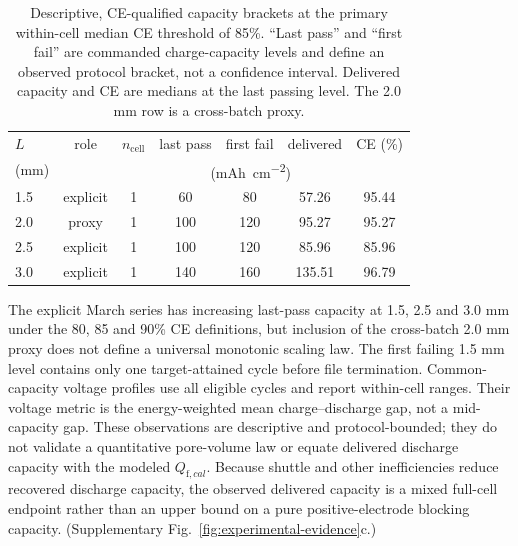 \documentclass[11pt]{article}
\begin{document}
\begin{table}[h]\centering\small
\caption{Descriptive, CE-qualified capacity brackets at the primary within-cell median CE threshold of
85\%. ``Last pass'' and ``first fail'' are commanded charge-capacity levels and define an observed protocol
bracket, not a confidence interval. Delivered capacity and CE are medians at the last passing level. The
2.0 mm row is a cross-batch proxy.}
\label{tab:compression}
\begin{tabular}{lcccccc}
\toprule
$L$ & role & $n_{\mathrm{cell}}$ & last pass & first fail & delivered & CE (\%)\\
(mm) & & & \multicolumn{3}{c}{(\si{mAh.cm^{-2}})} & \\
\midrule
1.5 & explicit & 1 & 60 & 80 & 57.26 & 95.44\\
2.0 & proxy & 1 & 100 & 120 & 95.27 & 95.27\\
2.5 & explicit & 1 & 100 & 120 & 85.96 & 85.96\\
3.0 & explicit & 1 & 140 & 160 & 135.51 & 96.79\\
\bottomrule
\end{tabular}
\end{table}

The explicit March series has increasing last-pass capacity at 1.5, 2.5 and 3.0 mm under the 80, 85 and
90\% CE definitions, but inclusion of the cross-batch 2.0 mm proxy does not define a universal monotonic
scaling law. The first failing 1.5 mm level contains only one target-attained cycle before file termination.
Common-capacity voltage profiles use all eligible cycles and report within-cell ranges. Their voltage metric is
the energy-weighted mean charge--discharge gap, not a mid-capacity gap. These observations are descriptive and
protocol-bounded; they do not validate a quantitative pore-volume law or equate delivered discharge capacity
with the modeled $Q_{\mathrm f,cal}$. Because shuttle and other inefficiencies reduce recovered discharge
capacity, the observed delivered capacity is a mixed full-cell endpoint rather than an upper bound on a pure
positive-electrode blocking capacity.
(Supplementary Fig.~\ref{fig:experimental-evidence}c.)
\end{document}

